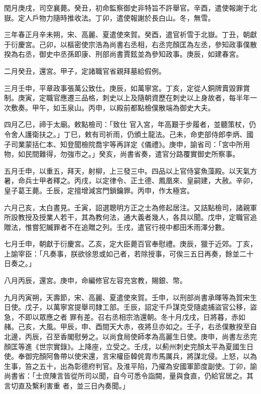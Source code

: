 \begin{pinyinscope}
 閏月庚戌，司空襄薨。癸丑，初命監察御史非特旨不許舉官。辛酉，遣使報謝于北嶽。定人戶物力隨時推收法。丁卯，遣使報謝於長白山。冬，無雪。



 三年春正月辛未朔，宋、高麗、夏遣使來賀。癸酉，遣官祈雪于北嶽。丁丑，朝獻于衍慶宮。己卯，以樞密使宗浩為尚書右丞相，右丞完顏匡為左丞，參知政事僕散揆為右丞，御史中丞孫即康、刑部尚書賈鉉並為參知政事。庚辰，如建春宮。



 二月癸丑，還宮。甲子，定諸職官省親拜墓給假例。



 三月壬申，平章政事張萬公致仕。庚辰，如萬寧宮。丁亥，定從人銅牌賣毀罪賞制。庚寅，定職官應遷三品格，刺史以上及隨朝資歷在刺史以上身故者，每半年一次敷奏。甲午，如玉泉山。丙申，以殿前都點檢僕散端為御史大夫。



 四月乙巳，禘于太廟。敕點檢司：「致仕
 官入宮，年高艱于步履者，並聽策杖，仍令舍人護衛扶之。」丁巳，敕有司祈雨，仍頒土龍法。己未，命吏部侍郎李炳、國子司業蒙括仁本、知登聞檢院喬宇等再詳定《儀禮》。庚申，諭省司：「宮中所用物，如民間難得，勿強市之。」癸亥，尚書省奏，遣官分路覆實御史所察事。



 五月壬申，以重五，拜天，射柳，上三發三中。四品以上官侍宴魚藻殿。以天氣方暑，命兵士甲者釋之。丙戌，以定律令、正土德、鳳凰來、皇嗣建，大赦。辛卯，皇子葛王薨。壬辰，定擅增減宮門鎖鑰罪。丙申，作太極宮。



 六月己亥，太白晝見。壬寅，詔選聰明方正之士為修起居注。又詰點檢司，諸親軍
 所設教授及授業人若干，其為教何法，通大義者幾人，各具以聞。戊申，定職官追贈法，惟嘗犯贓罪者不在追贈之列。壬戌，遣官行視中都田禾雨澤分數。



 七月壬申，朝獻于衍慶宮。乙亥，定大臣薨百官奉慰禮。庚辰，獵于近郊。丁亥，上諭宰臣：「凡奏事，朕欲徐思或如己者，若除授事，可俟三五日再奏，餘並二十日奏之。」



 八月丙辰，還宮。庚申，命編修官左容充宮教，賜銀、幣。



 九月丙寅朔，天壽節，宋、高麗、夏遣使來賀。壬申，以刑部尚書承暉等為賀宋生日使。戊子，以萬寧宮提舉司隸工部。壬辰，詔定千戶謀克受隨處捕盜官公移，盜急，不即以眾應之者
 罪有差。召右丞相宗浩還朝。冬十月戊戌，日將暮，赤如赭。己亥，大風。甲辰，申、酉間天大赤，夜將旦亦如之。壬子，右丞僕散揆至自北邊，丙辰，召至香閣慰勞之。以尚食局使師孝為高麗生日使。庚申，尚書左丞完顏匡等進《世宗實錄》。上降座，立受之。壬戌，以薊州刺史完顏太平為夏國生日使。奉御完顏阿魯帶以使宋還，言宋權臣韓侂胄市馬厲兵，將謀北侵。上怒，以為生事，笞之五十，出為彰德府判官。及淮平陷，乃擢為安國軍節度副使。丁卯，諭尚書省：「士庶陳言皆從所司以聞，自今可悉令詣闕，量與食直，仍給官居之。其言切直及繫利害重
 者，並三日內奏聞。」




\end{pinyinscope}
